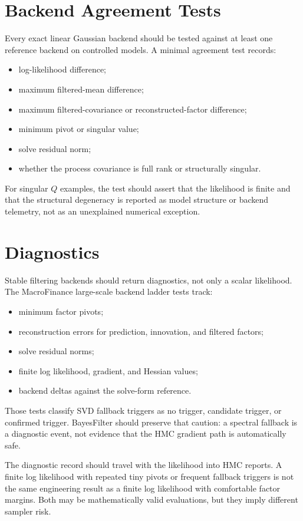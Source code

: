 \section{Backend Agreement Tests}
\label{sec:bf-linear-backend-agreement-tests}

Every exact linear Gaussian backend should be tested against at least one
reference backend on controlled models.  A minimal agreement test records:
\begin{itemize}
  \item log-likelihood difference;
  \item maximum filtered-mean difference;
  \item maximum filtered-covariance or reconstructed-factor difference;
  \item minimum pivot or singular value;
  \item solve residual norm;
  \item whether the process covariance is full rank or structurally singular.
\end{itemize}
For singular $Q$ examples, the test should assert that the likelihood is
finite and that the structural degeneracy is reported as model structure or
backend telemetry, not as an unexplained numerical exception.

\section{Diagnostics}
\label{sec:bf-stable-linear-diagnostics}

Stable filtering backends should return diagnostics, not only a scalar
likelihood.  The MacroFinance large-scale backend ladder tests track:
\begin{itemize}
  \item minimum factor pivots;
  \item reconstruction errors for prediction, innovation, and filtered factors;
  \item solve residual norms;
  \item finite log likelihood, gradient, and Hessian values;
  \item backend deltas against the solve-form reference.
\end{itemize}
Those tests classify SVD fallback triggers as no trigger, candidate trigger, or
confirmed trigger.  BayesFilter should preserve that caution: a spectral
fallback is a diagnostic event, not evidence that the HMC gradient path is
automatically safe.

The diagnostic record should travel with the likelihood into HMC reports.  A
finite log likelihood with repeated tiny pivots or frequent fallback triggers
is not the same engineering result as a finite log likelihood with comfortable
factor margins.  Both may be mathematically valid evaluations, but they imply
different sampler risk.
